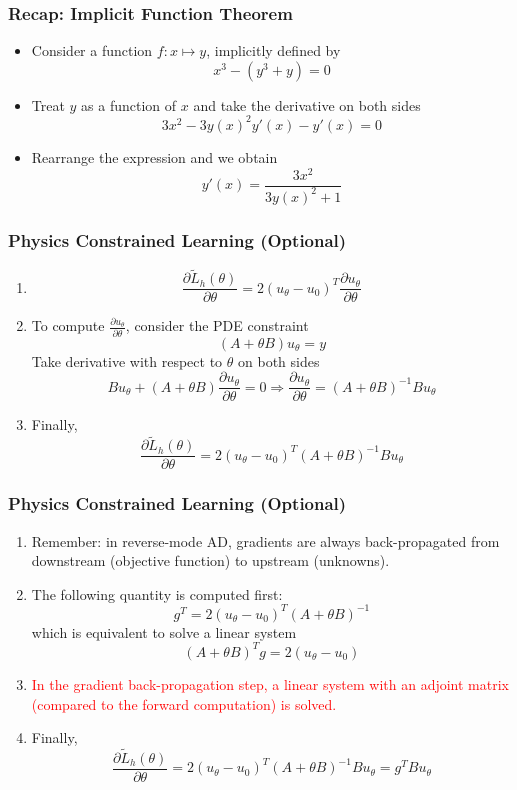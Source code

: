 \documentclass{beamer}
\begin{document}
\begin{frame}
	\frametitle{Recap: Implicit Function Theorem}
	
	\begin{itemize}
		\item Consider a function $f:x\mapsto y$, implicitly defined by 
		$$x^3-(y^3+y) = 0$$
		\item Treat $y$ as a function of $x$ and take the derivative on both sides
		$$3x^2 - 3y(x)^2y'(x)-y'(x)=0$$
\item Rearrange the expression and we obtain 
$$y'(x) = \frac{3x^2}{3y(x)^2+1}$$
	\end{itemize}
	
\end{frame}


\begin{frame}
	\frametitle{Physics Constrained Learning (Optional)}
	\begin{enumerate}
		\item 
		$$\frac{\partial \tilde L_h(\theta)}{\partial \theta} = 2(u_\theta-u_0)^T \frac{\partial u_\theta}{\partial \theta}$$
\item To compute $\frac{\partial u_\theta}{\partial \theta}$, consider the PDE constraint 
$$(A+\theta B) u_\theta = y$$
Take derivative with respect to $\theta$ on both sides 
$$Bu_\theta + (A+\theta B) \frac{\partial u_\theta}{\partial \theta} = 0\Rightarrow \frac{\partial u_\theta}{\partial \theta} = (A+\theta B)^{-1} Bu_\theta$$
\item Finally, 
$$\frac{\partial \tilde L_h(\theta)}{\partial \theta} = 2(u_\theta-u_0)^T(A+\theta B)^{-1} Bu_\theta$$
	\end{enumerate}
\end{frame}

\begin{frame}
	\frametitle{Physics Constrained Learning (Optional)}
	
	\begin{enumerate}
		\item Remember: in reverse-mode AD, gradients are always back-propagated from downstream (objective function) to upstream (unknowns). 
		\item The following quantity is computed first:
		$$g^T = 2(u_\theta-u_0)^T(A+\theta B)^{-1}$$
		which is equivalent to solve a linear system 
		$$(A+\theta B)^T g = 2(u_\theta-u_0)$$
		\item \textcolor{red}{In the gradient back-propagation step, a linear system with an adjoint matrix (compared to the forward computation) is solved.} 
		\item Finally, 
		$$\frac{\partial \tilde L_h(\theta)}{\partial \theta} = 2(u_\theta-u_0)^T(A+\theta B)^{-1} Bu_\theta = g^T Bu_\theta$$
	\end{enumerate}
\end{frame}
\end{document}
